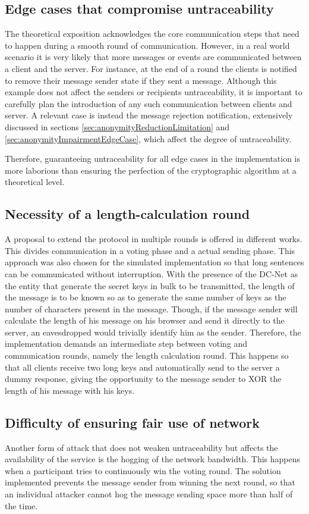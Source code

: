 \subsection{Edge cases that compromise untraceability}
The theoretical exposition acknowledges the core communication steps that need to happen during a smooth round of communication. However, in a real world scenario it is very likely that more messages or events are communicated between a client and the server. For instance, at the end of a round the clients is notified to remove their message sender state if they sent a message.  Although this example does not affect the senders or recipients untraceability, it is important to carefully plan the introduction of any such communication between clients and server. A relevant case is instead the message rejection notification, extensively discussed in sections \ref{sec:anonymityReductionLimitation} and \ref{sec:anonymityImpairmentEdgeCase}, which affect the degree of untraceability.  

Therefore, guaranteeing untraceability for all edge cases in the implementation is more laborious than ensuring the perfection of the cryptographic algorithm at a theoretical level.


\subsection{Necessity of a length-calculation round}
A proposal to extend the protocol in multiple rounds is offered in different works. This divides communication in a voting phase and a actual sending phase. This approach was also chosen for the simulated implementation so that long sentences can be communicated without interruption. With the presence of the DC-Net as the entity that generate the secret keys in bulk to be transmitted, the length of the message is to be known so as to generate the same number of keys as the number of characters present in the message. Though, if the message sender will calculate the length of his message on his browser and send it directly to the server, an eavesdropped would trivially identify him as the sender. Therefore, the implementation demands an intermediate step between voting and communication rounds, namely the length calculation round. This happens so that all clients receive two long keys and automatically send to the server a dummy response, giving the opportunity to the message sender to XOR the length of his message with his keys.


\subsection{Difficulty of ensuring fair use of network}
Another form of attack that does not weaken untraceability but affects the availability of the service is the hogging of the network bandwidth. This happens when a participant tries to continuously win the voting round. The solution implemented prevents the message sender from winning the next round, so that an individual attacker cannot hog the message sending space more than half of the time. 

